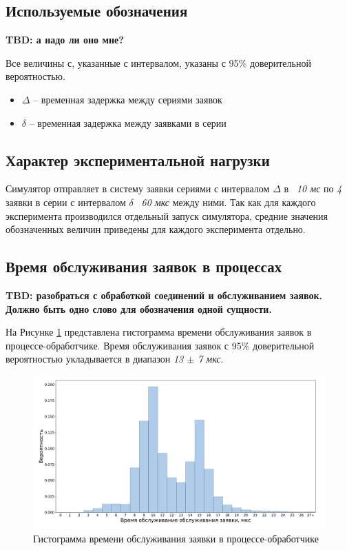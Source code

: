 \subsection{Используемые обозначения}
\textbf{TBD: а надо ли оно мне?}

Все величины с, указанные с интервалом, указаны с 95\% доверительной вероятностью.

\begin{itemize}
\item $\Delta$ -- временная задержка между сериями заявок
\item $\delta$ -- временная задержка между заявками в серии
\end{itemize}

\subsection{Характер экспериментальной нагрузки}

Симулятор отправляет в систему заявки сериями с интервалом $\Delta$ в \textit{~10 мс} по \textit{4} заявки в серии с интервалом $\delta$ \textit{~60 мкс} между ними. Так как для каждого эксперимента производился отдельный запуск симулятора, средние значения обозначенных величин приведены для каждого эксперимента отдельно.

\subsection{Время обслуживания заявок в процессах}
\textbf{TBD: разобраться с обработкой соединений и обслуживанием заявок. Должно быть одно слово для обозначения одной сущности.}

На Рисунке \ref{chapter41:EngineLatency} представлена гистограмма времени обслуживания заявок в процессе-обработчике. Время обслуживания заявок с 95\% доверительной вероятностью укладывается в диапазон \textit{13 $\pm$ 7 мкс}.
\begin{figure}[!h]
\caption{Гистограмма времени обслуживания заявки в процессе-обработчике}
\label{chapter41:EngineLatency}
\includegraphics[width=\textwidth]{../../graphics/hist/Engine}
\end{figure}

